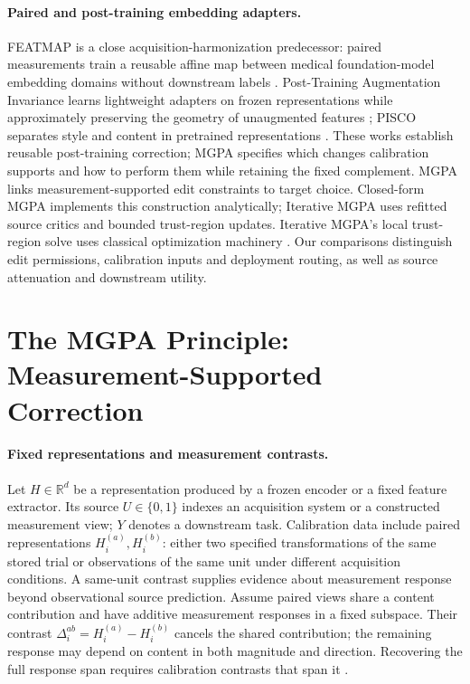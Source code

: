 \documentclass{article}
\theoremstyle{plain}
\theoremstyle{definition}
\newcommand{\R}{\mathbb R}
\begin{document}
\paragraph{Paired and post-training embedding adapters.}
FEATMAP is a close acquisition-harmonization predecessor: paired
measurements train a reusable affine map between medical foundation-model
embedding domains without downstream labels \citep{donle2026featmap}.
Post-Training Augmentation Invariance learns lightweight adapters on
frozen representations while approximately preserving the geometry of
unaugmented features \citep{eikenberry2026}; PISCO separates style and
content in pretrained representations \citep{ngweta2023}. These works
establish reusable post-training correction; MGPA specifies which changes
calibration supports and how to perform them while retaining the fixed
complement. MGPA links measurement-supported edit constraints to target choice.
Closed-form MGPA implements this construction analytically; Iterative MGPA
uses refitted source critics and bounded trust-region updates.
Iterative MGPA's local trust-region solve uses classical
optimization machinery \citep{more1983}. Our comparisons
distinguish edit permissions, calibration inputs and deployment routing,
as well as source attenuation and downstream utility.
\section{The MGPA Principle: Measurement-Supported Correction}
\label{sec:admissibility}
\paragraph{Fixed representations and measurement contrasts.}
Let $H\in\R^d$ be a representation produced by a frozen encoder or a fixed
feature extractor. Its source $U\in\{0,1\}$ indexes an acquisition system
or a constructed measurement view; $Y$ denotes a downstream task.
Calibration data include paired representations $H_i^{(a)},H_i^{(b)}$:
either two specified transformations of the same stored trial or observations
of the same unit under different acquisition conditions. A same-unit contrast
supplies evidence about measurement response beyond observational source prediction.
Assume paired views share a content contribution and have additive measurement
responses in a fixed subspace. Their contrast
$\Delta_i^{ab}=H_i^{(a)}-H_i^{(b)}$ cancels the shared contribution; the remaining
response may depend on content in both magnitude and direction. Recovering the
full response span requires calibration contrasts that span it \citep{bai2025ncm}.
\end{document}
